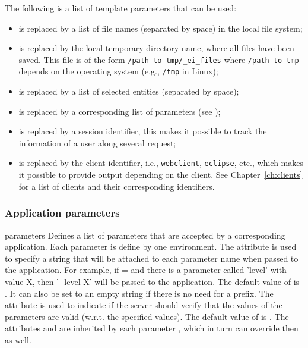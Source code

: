{  \bigskip 
  \noindent
  The following is a list of template parameters that can be used:

  \begin{itemize}
  \item {} is replaced by a list of file
    names (separated by space) in the local file system;

  \item {} is replaced by the local
    temporary directory name, where all files have been saved. This
    file is of the form \texttt{/path-to-tmp/\_ei\_files} where
    \texttt{/path-to-tmp} depends on the operating system (e.g.,
    \texttt{/tmp} in Linux);
  \item {} is replaced by a list of
    selected entities (separated by space);
  \item {} is replaced by a
    corresponding list of parameters (see );
  \item {} is replaced by a session
    identifier, this makes it possible to track the information of a
    user along several request;
  \item {} is replaced by the client
    identifier, i.e., \texttt{webclient}, \texttt{eclipse}, etc.,
    which makes it possible to provide output depending on the
    client. See Chapter~\ref{ch:clients} for a list of clients and
    their corresponding identifiers.
  \end{itemize}
%
}
{}%

\subsubsection{Application parameters}

\bigskip 
\xmlstruct
{parameters} 
{%
%
  Defines a list of parameters that are accepted by a corresponding
  application. Each parameter is define by one 
  environment. 
  The  attribute is used to specify a string
  that will be attached to each parameter name when passed to the
  application.
  For example, if = and
  there is a parameter called 'level' with value X, then '{-}{-}level
  X' will be passed to the application.  The default value of
   is . It can also be set
  to an empty string if there is no need for a prefix.
  The  attribute is used to indicate if the
  server should verify that the values of the parameters are valid
  (w.r.t. the specified values). The default value of
   is .
  The attributes  and  are
  inherited by each parameter , which in turn can
  override then as well.
%
}
{}%

